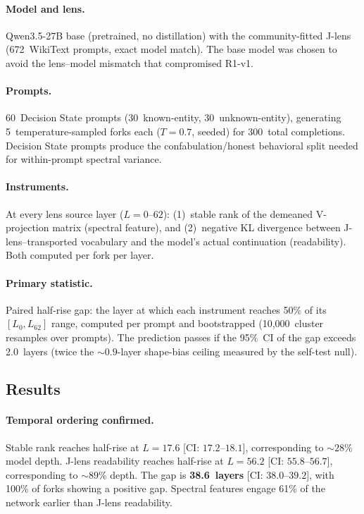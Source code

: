 \documentclass[11pt,a4paper]{article}
\begin{document}
\paragraph{Model and lens.} Qwen3.5-27B base (pretrained, no
distillation) with the community-fitted J-lens (672~WikiText prompts,
exact model match). The base model was chosen to avoid the lens--model
mismatch that compromised R1-v1.

\paragraph{Prompts.} 60~Decision State prompts (30~known-entity,
30~unknown-entity), generating 5~temperature-sampled forks each
($T{=}0.7$, seeded) for 300~total completions. Decision State prompts
produce the confabulation/honest behavioral split needed for
within-prompt spectral variance.

\paragraph{Instruments.} At every lens source layer ($L{=}0$--$62$):
(1)~stable rank of the demeaned V-projection matrix (spectral feature),
and (2)~negative KL divergence between J-lens--transported vocabulary
and the model's actual continuation (readability). Both computed per
fork per layer.

\paragraph{Primary statistic.} Paired half-rise gap: the layer at which
each instrument reaches 50\% of its $[L_0, L_{62}]$ range, computed per
prompt and bootstrapped (10{,}000~cluster resamples over prompts). The
prediction passes if the 95\%~CI of the gap exceeds 2.0~layers (twice
the ${\sim}0.9$-layer shape-bias ceiling measured by the self-test null).

\subsection{Results}

\paragraph{Temporal ordering confirmed.} Stable rank reaches half-rise
at $L{=}17.6$ [CI: $17.2$--$18.1$], corresponding to ${\sim}28\%$
model depth. J-lens readability reaches half-rise at $L{=}56.2$
[CI: $55.8$--$56.7$], corresponding to ${\sim}89\%$ depth. The gap is
\textbf{38.6~layers} [CI: $38.0$--$39.2$], with 100\% of forks showing
a positive gap. Spectral features engage 61\% of the network earlier
than J-lens readability.
\end{document}

